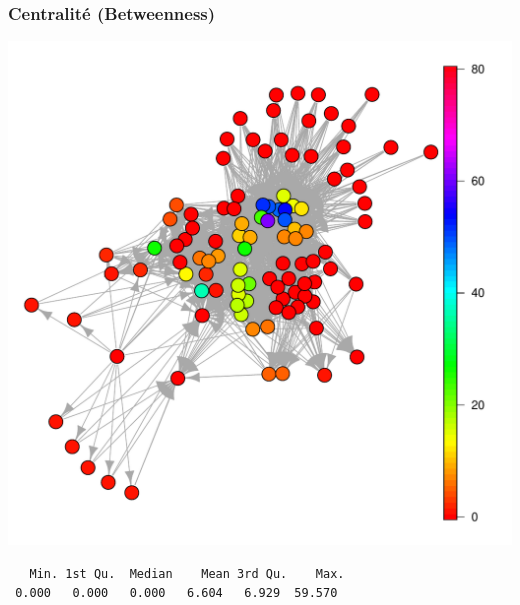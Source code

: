 \documentclass[nopagenumber,9pt]{beamer}
\begin{document}
\begin{frame}[fragile]
 \frametitle{Centralité (Betweenness)}
 
 \begin{center}
  \includegraphics[scale=.3]{plots/chilean_between.pdf}
 \end{center}

\begin{verbatim}
   Min. 1st Qu.  Median    Mean 3rd Qu.    Max. 
 0.000   0.000   0.000   6.604   6.929  59.570
\end{verbatim} 
 
\end{frame}
\end{document}
